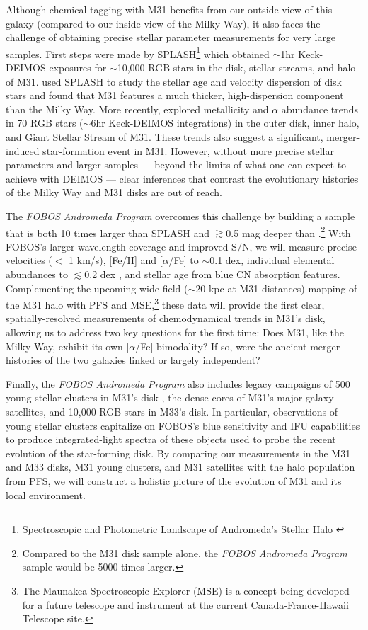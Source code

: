 \documentclass[11pt,a4paper,twoside,onecolumn,openany,final,oldfontcommands]{memoir}
\begin{document}
Although chemical tagging with M31 benefits from our outside view of this galaxy (compared to our inside view of the Milky Way), it also faces the challenge of obtaining precise stellar parameter measurements for very large samples.  First steps were made by SPLASH\footnote{Spectroscopic and Photometric Landscape of Andromeda’s Stellar Halo \citep[e.g.][]{splash}} which obtained $\sim$1hr Keck-DEIMOS exposures for $\sim$10,000 RGB stars in the disk, stellar streams, and halo of M31.  \citet{dorman15} used SPLASH to study the stellar age and velocity dispersion of disk stars and found that M31 features a much thicker, high-dispersion component than the Milky Way.  More recently, \citet{Escala20} explored metallicity and $\alpha$ abundance trends in 70 RGB stars ($\sim$6hr Keck-DEIMOS integrations) in the outer disk, inner halo, and Giant Stellar Stream of M31.  These trends also suggest a significant, merger-induced star-formation event in M31.  However, without more precise stellar parameters and larger samples --- beyond the limits of what one can expect to achieve with DEIMOS --- clear inferences that contrast the evolutionary histories of the Milky Way and M31 disks are out of reach.

The \textit{ FOBOS Andromeda Program} overcomes this challenge by building a sample that is both 10 times larger than SPLASH and $\gtrsim$0.5 mag deeper than \citet{Escala20}.\footnote{Compared to the \citet{Escala20} M31 disk sample alone, the \textit{ FOBOS Andromeda Program} sample would be 5000 times larger.}  With FOBOS's larger wavelength coverage and improved S/N, we will measure precise velocities ($<$ 1 km/s), [Fe/H] and [$\alpha$/Fe] to $\sim$0.1 dex, individual elemental abundances to $\lesssim$0.2 dex \citep[Fig.~\ref{fig:abundances_snr}; cf.][]{YST2017}, and stellar age from blue CN absorption features.  Complementing the upcoming wide-field ($\sim$20 kpc at M31 distances) mapping of the M31 halo with PFS and MSE,\footnote{The Maunakea Spectroscopic Explorer (MSE) is a concept being developed for a future telescope and instrument at the current Canada-France-Hawaii Telescope site.} these data will provide the first clear, spatially-resolved measurements of chemodynamical trends in M31's disk, allowing us to address two key questions for the first time: Does M31, like the Milky Way, exhibit its own [$\alpha$/Fe] bimodality?  If so, were the ancient merger histories of the two galaxies linked or largely independent?

Finally, the \textit{ FOBOS Andromeda Program} also includes legacy campaigns of 500 young stellar clusters in M31's disk \citep[dwarfing even Milky Way samples,][]{johnson15}, the dense cores of M31's major galaxy satellites, and 10,000 RGB stars in M33's disk.  In particular, observations of young stellar clusters capitalize on FOBOS's blue sensitivity and IFU capabilities to produce integrated-light spectra of these objects used to probe the recent evolution of the star-forming disk.  By comparing our measurements in the M31 and M33 disks, M31 young clusters, and M31 satellites with the halo population from PFS, we will construct a holistic picture of the evolution of M31 and its local environment.
\end{document}
